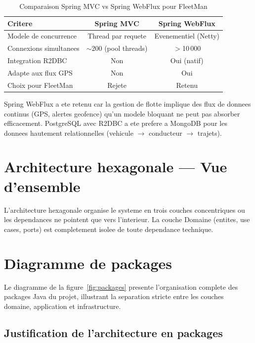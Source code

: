 \documentclass[12pt,a4paper]{report}
\begin{document}
\begin{table}[H]
\caption{Comparaison Spring MVC vs Spring WebFlux pour FleetMan}
\label{tab:spring}
\centering
\begin{tabularx}{\textwidth}{Xcc}
\toprule
\textbf{Critere} & \textbf{Spring MVC} & \textbf{Spring WebFlux} \\
\midrule
Modele de concurrence    & Thread par requete       & Evenementiel (Netty) \\
Connexions simultanees   & $\sim$200 (pool threads) & $>$10\,000 \\
Integration R2DBC        & Non                      & Oui (natif) \\
Adapte aux flux GPS      & Non                      & Oui \\
Choix pour FleetMan      & \textcolor{fleeterror}{Rejete} & \textcolor{fleetsuccess}{Retenu} \\
\bottomrule
\end{tabularx}
\end{table}

Spring WebFlux a ete retenu car la gestion de flotte implique des flux
de donnees continus (GPS, alertes geofence) qu'un modele bloquant
ne peut pas absorber efficacement.
PostgreSQL avec R2DBC a ete prefere a MongoDB pour les donnees
hautement relationnelles (vehicule $\to$ conducteur $\to$ trajets).

\section{Architecture hexagonale --- Vue d'ensemble}

L'architecture hexagonale organise le systeme en trois couches concentriques
ou les dependances ne pointent que vers l'interieur.
La couche Domaine (entites, use cases, ports) est completement isolee
de toute dependance technique.

\section{Diagramme de packages}

Le diagramme de la figure~\ref{fig:packages} presente l'organisation
complete des packages Java du projet, illustrant la separation stricte
entre les couches domaine, application et infrastructure.

\subsection{Justification de l'architecture en packages}
\end{document}
